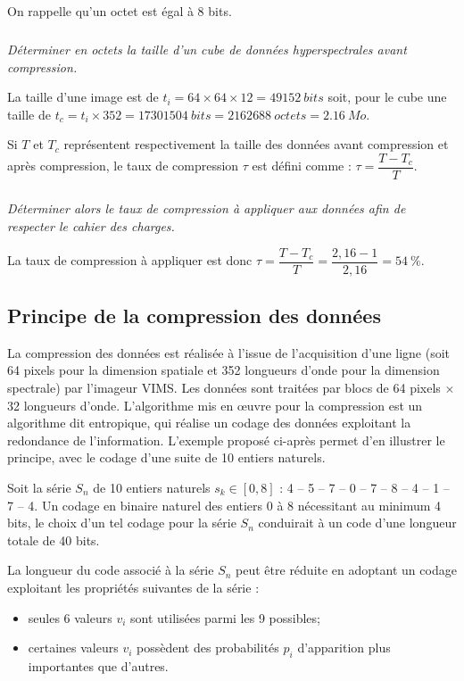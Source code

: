 \documentclass[10pt,fleqn]{article} %
\begin{document}
On rappelle qu'un octet est égal à 8 bits.
\fi


\subparagraph{}\textit{Déterminer en octets la taille d'un cube de données hyperspectrales avant compression.}
\ifprof
\begin{corrige} La taille d'une image est de $t_i = 64 \times 64 \times 12= \SI{49152}{bits} $ soit, pour le cube une taille de $t_c = t_i\times 352 = \SI{17301504}{bits}=\SI{2 162 688}{octets}=\SI{2,16}{Mo}$.
\end{corrige}
\else
\fi


\ifprof
\else

Si $T$ et $T_c$ représentent respectivement la taille des données avant compression et après
compression, le taux de compression $\tau$ est défini comme : $\tau = \dfrac{T-T_c}{T}$.
\fi

\subparagraph{}\textit{Déterminer alors le taux de compression à appliquer aux données afin de respecter le cahier
des charges.}
\ifprof
\begin{corrige} La taux de compression à appliquer est donc $\tau = \dfrac{T-T_c}{T}= \dfrac{2,16-1}{2,16}=\SI{54}{\%}$.
\end{corrige}

\else
\fi

\subsection{Principe de la compression des données}

\ifprof
\else

La compression des données est réalisée à l'issue de l'acquisition d'une ligne (soit 64 pixels
pour la dimension spatiale et 352 longueurs d'onde pour la dimension spectrale) par l'imageur
VIMS. Les données sont traitées par blocs de 64 pixels $\times$ 32 longueurs d'onde. L'algorithme
mis en \oe{}uvre pour la compression est un algorithme dit entropique, qui réalise un codage des
données exploitant la redondance de l'information. L'exemple proposé ci-après permet d'en
illustrer le principe, avec le codage d'une suite de 10 entiers naturels.

Soit la série $S_n$ de 10 entiers naturels $s_k \in[0, 8]$ : 4 -- 5 -- 7 -- 0 -- 7 -- 8 -- 4 -- 1 -- 7 -- 4.
Un codage en binaire naturel des entiers 0 à 8 nécessitant au minimum 4 bits, le choix d'un tel
codage pour la série $S_n$ conduirait à un code d'une longueur totale de 40 bits.

La longueur du code associé à la série $S_n$ peut être réduite en adoptant un codage exploitant
les propriétés suivantes de la série :
\begin{itemize}
\item seules 6 valeurs $v_i$ sont utilisées parmi les 9 possibles;
\item certaines valeurs $v_i$ possèdent des probabilités $p_i$ d'apparition plus importantes que d'autres.
\end{itemize}
\end{document}
